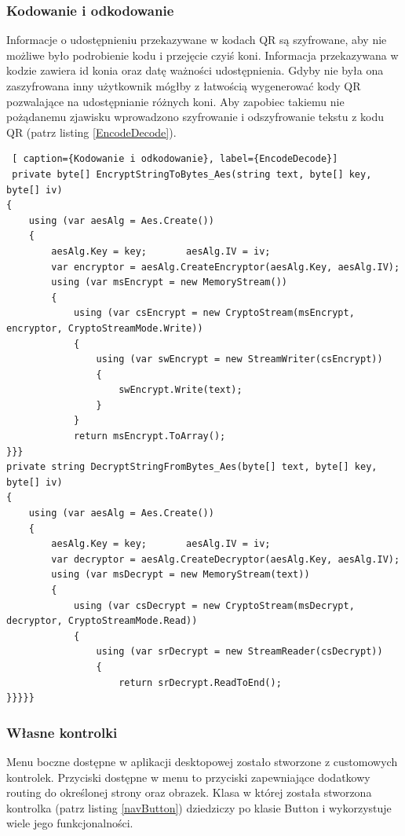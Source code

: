 \documentclass[12pt,oneside]{report}
\begin{document}
\subsubsection{Kodowanie i odkodowanie}
Informacje o udostępnieniu przekazywane w kodach QR są szyfrowane, aby nie możliwe było podrobienie kodu i przejęcie czyiś koni. Informacja przekazywana w kodzie zawiera id konia oraz datę ważności udostępnienia. Gdyby nie była ona zaszyfrowana inny użytkownik mógłby z łatwością wygenerować kody QR pozwalające na udostępnianie różnych koni. Aby zapobiec takiemu nie pożądanemu zjawisku wprowadzono szyfrowanie i odszyfrowanie tekstu z kodu QR (patrz listing \ref{EncodeDecode}). \\
\begin{lstlisting} [ caption={Kodowanie i odkodowanie}, label={EncodeDecode}]	
 private byte[] EncryptStringToBytes_Aes(string text, byte[] key, byte[] iv)
{
	using (var aesAlg = Aes.Create())
	{
		aesAlg.Key = key;		aesAlg.IV = iv;
		var encryptor = aesAlg.CreateEncryptor(aesAlg.Key, aesAlg.IV);
		using (var msEncrypt = new MemoryStream())
		{
			using (var csEncrypt = new CryptoStream(msEncrypt, encryptor, CryptoStreamMode.Write))
			{
				using (var swEncrypt = new StreamWriter(csEncrypt))
				{
					swEncrypt.Write(text);
				}
			}
			return msEncrypt.ToArray();
}}}
private string DecryptStringFromBytes_Aes(byte[] text, byte[] key, byte[] iv)
{
	using (var aesAlg = Aes.Create())
	{
		aesAlg.Key = key;		aesAlg.IV = iv;
		var decryptor = aesAlg.CreateDecryptor(aesAlg.Key, aesAlg.IV);
		using (var msDecrypt = new MemoryStream(text))
		{
			using (var csDecrypt = new CryptoStream(msDecrypt, decryptor, CryptoStreamMode.Read))
			{
				using (var srDecrypt = new StreamReader(csDecrypt))
				{
					return srDecrypt.ReadToEnd();
}}}}}
\end{lstlisting}
\subsubsection{Własne kontrolki}
Menu boczne dostępne w aplikacji desktopowej zostało stworzone z customowych kontrolek. Przyciski dostępne w menu to przyciski zapewniające dodatkowy routing do określonej strony oraz obrazek. Klasa w której została stworzona kontrolka (patrz listing \ref{navButton}) dziedziczy po klasie Button i wykorzystuje wiele jego funkcjonalności.\\
\end{document}
